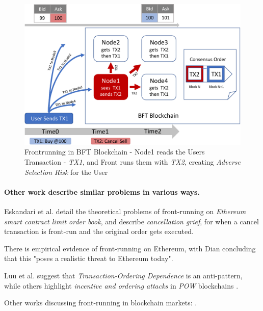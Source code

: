 \documentclass[12pt]{article}
\begin{document}
\begin{figure}[ht]
  \centering \includegraphics[scale=0.4]{frontrunning3-crop.pdf}
  \caption{Frontrunning in BFT Blockchain - Node1 reads the Users Transaction - \emph{TX1}, and Front runs them with \emph{TX2}, creating \emph{Adverse Selection Risk} for the User}\label{fig:front-running}
\end{figure}

\paragraph{Other work describe similar problems in various ways.} Eskandari et al. \cite{Eskandari} detail the theoretical problems of front-running on \emph{Ethereum} \emph{smart contract limit order book}, and describe \emph{cancellation grief}, for when a cancel transaction is front-run and the  original order gets executed. 

There is empirical evidence of front-running on Ethereum, with Dian concluding that this "poses a realistic threat to Ethereum today". \cite{Daian} 

Luu et al. \cite{Luu} suggest that \emph{Transaction-Ordering Dependence} is an anti-pattern, while others highlight \emph{incentive and ordering attacks} in \emph{POW} blockchains \cite{Judmayer} \cite{Delmolino}. 

Other works discussing front-running in blockchain markets: \cite{Malinova,Eskandari,Clark,Berg}.
\end{document}

